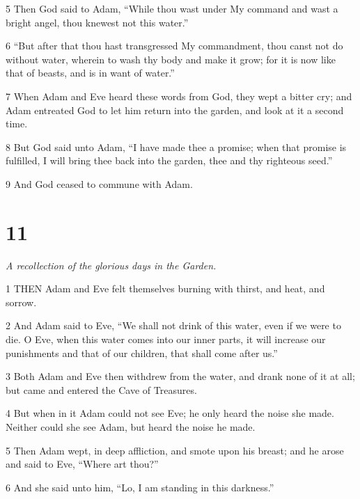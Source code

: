 \par 5 Then God said to Adam, “While thou wast under My command and wast a bright angel, thou knewest not this water.”

\par 6 “But after that thou hast transgressed My commandment, thou canst not do without water, wherein to wash thy body and make it grow; for it is now like that of beasts, and is in want of water.”

\par 7 When Adam and Eve heard these words from God, they wept a bitter cry; and Adam entreated God to let him return into the garden, and look at it a second time.

\par 8 But God said unto Adam, “I have made thee a promise; when that promise is fulfilled, I will bring thee back into the garden, thee and thy righteous seed.”

\par 9 And God ceased to commune with Adam.

\chapter{11}

\par \textit{A recollection of the glorious days in the Garden.}

\par 1 THEN Adam and Eve felt themselves burning with thirst, and heat, and sorrow.

\par 2 And Adam said to Eve, “We shall not drink of this water, even if we were to die. O Eve, when this water comes into our inner parts, it will increase our punishments and that of our children, that shall come after us.”

\par 3 Both Adam and Eve then withdrew from the water, and drank none of it at all; but came and entered the Cave of Treasures.

\par 4 But when in it Adam could not see Eve; he only heard the noise she made. Neither could she see Adam, but heard the noise he made.

\par 5 Then Adam wept, in deep affliction, and smote upon his breast; and he arose and said to Eve, “Where art thou?”

\par 6 And she said unto him, “Lo, I am standing in this darkness.”

